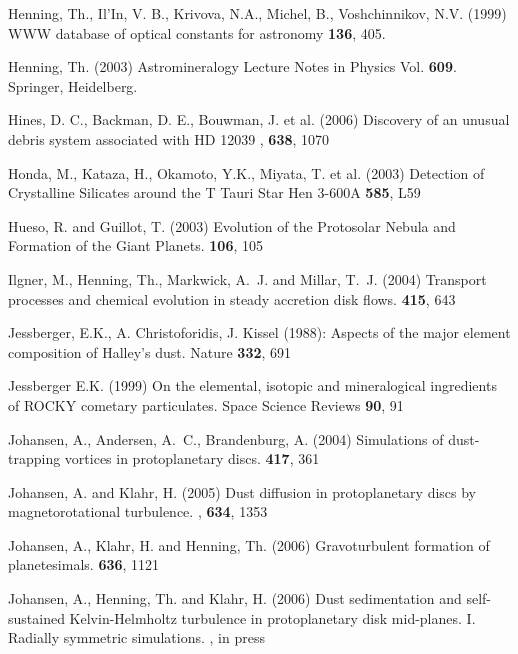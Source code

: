 \begin{literature}
\item
Henning, Th., Il'In, V. B., Krivova, N.A., Michel, B., Voshchinnikov, N.V.
(1999) WWW database of optical constants for astronomy \aaps \textbf{136},
405.

\item
Henning, Th. (2003) Astromineralogy Lecture Notes
in Physics Vol. \textbf{609}. Springer, Heidelberg.

\item
Hines, D. C., Backman, D. E., Bouwman, J. et al. (2006) 
Discovery of an unusual debris system associated with HD 12039 \apj,
\textbf{638}, 1070

\item
Honda, M., Kataza, H., Okamoto, Y.K., Miyata, T. et al. (2003) 
Detection of Crystalline Silicates around the T Tauri Star Hen 3-600A
\apj \textbf{585}, L59

\item
Hueso, R. and Guillot, T. (2003) Evolution of the Protosolar Nebula and
Formation of the Giant Planets. \ssr \textbf{106}, 105

\item
Ilgner, M., Henning, Th., Markwick, A.~J. and Millar, T.~J. (2004) Transport
processes and chemical evolution in steady accretion disk flows. \aap
\textbf{415}, 643

\item
Jessberger, E.K., A. Christoforidis, J. Kissel (1988): 
Aspects of the major element composition of Halley's dust.
Nature \textbf{332}, 691

Jessberger E.K. (1999) 
On the elemental, isotopic and mineralogical ingredients of
ROCKY cometary particulates.
Space Science Reviews \textbf{90}, 91

\item
Johansen, A., Andersen, A.~C., Brandenburg, A. (2004) Simulations of
dust-trapping vortices in protoplanetary discs. \aap \textbf{417}, 361

\item
Johansen, A. and Klahr, H. (2005) Dust diffusion in protoplanetary discs by
magnetorotational turbulence. \apj, \textbf{634}, 1353

\item
Johansen, A., Klahr, H. and  Henning, Th. (2006) Gravoturbulent formation of
planetesimals. \apj  \textbf{636}, 1121

\item 
Johansen, A., Henning, Th. and  Klahr, H. (2006) 
Dust sedimentation and self-sustained Kelvin-Helmholtz turbulence
in protoplanetary disk mid-planes. 
I. Radially symmetric simulations. \apj, in press


\end{literature}
